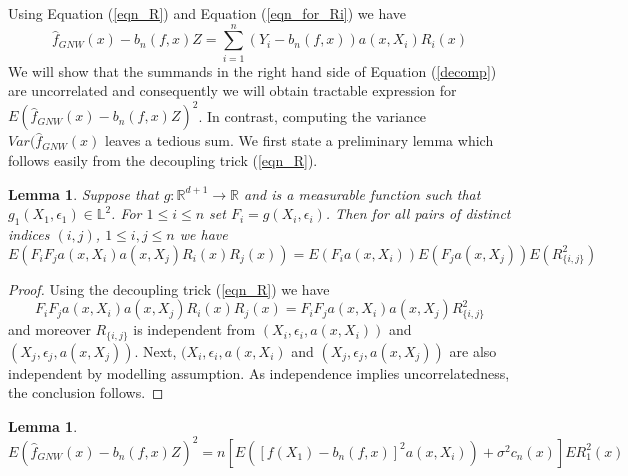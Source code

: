 \documentclass{article}
\newtheorem{lemma}[theorem]{Lemma}
\begin{document}
Using Equation (\ref{eqn_R}) and Equation (\ref{eqn_for_Ri}) we have
\begin{equation}
\label{decomp}
    \hat{f}_{GNW}(x)-b_n(f,x)Z=\sum_{i=1}^n(Y_i-b_n(f,x))a(x,X_i)R_i(x)
\end{equation}
We will show that the summands in the right hand side of Equation (\ref{decomp}) are uncorrelated and consequently we will obtain tractable expression for $E(\hat{f}_{GNW}(x)-b_n(f,x)Z)^2$. In contrast, computing the variance $Var(\hat{f}_{GNW}(x)$ leaves a tedious sum. We first state a preliminary lemma which follows easily from the decoupling trick (\ref{eqn_R}).
\begin{lemma}
\label{one_time_lemma}
Suppose that $g\colon\mathbb{R}^{d+1}\to\mathbb{R}$ and is a  measurable function such that $g_1(X_1,\epsilon_1)\in\mathbb{L}^2$. For $1\leq i\leq n$ set $F_i=g(X_i,\epsilon_i)$. Then for all pairs of distinct indices $(i,j)$, $1\leq i,j \leq n$ we have
\begin{equation*}
    E(F_iF_ja(x,X_i)a(x,X_j)R_i(x)R_j(x))=E(F_ia(x,X_i))E(F_ja(x,X_j))E(R_{\{i,j\}}^2)
\end{equation*}
\end{lemma}
\begin{proof}


Using the decoupling trick (\ref{eqn_R}) we have
\begin{equation*}
    F_iF_ja(x,X_i)a(x,X_j)R_i(x)R_j(x)=F_iF_ja(x,X_i)a(x,X_j)R_{\{i,j\}}^2
\end{equation*}
and moreover $R_{\{i,j\}}$ is independent from $(X_i,\epsilon_i,a(x,X_i))$ and $(X_j,\epsilon_j,a(x,X_j))$. Next, $(X_i,\epsilon_i,a(x,X_i)$ and $(X_j,\epsilon_j,a(x,X_j))$ are also independent by modelling assumption. As independence implies uncorrelatedness, the conclusion follows.
\end{proof}
\begin{lemma}
\label{trick_lemma_pt_1}
\begin{equation*}
    E(\hat{f}_{GNW}(x)-b_n(f,x)Z)^2=
    n[E([f(X_1)-b_n(f,x)]^2a(x,X_i))+\sigma^2c_n(x)]ER_1^2(x)
\end{equation*}
\end{lemma}
\end{document}
